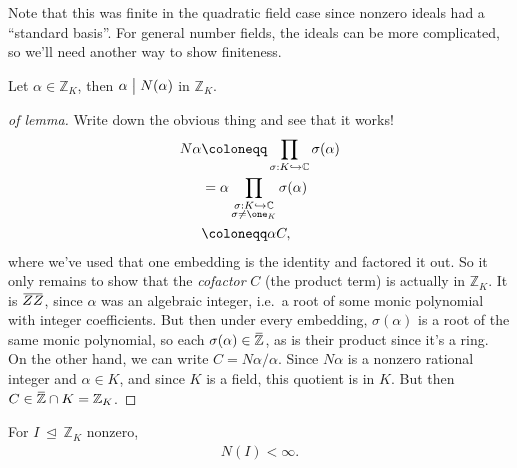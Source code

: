 \begin{remark}

Note that this was finite in the quadratic field case since nonzero
ideals had a ``standard basis''. For general number fields, the ideals
can be more complicated, so we'll need another way to show finiteness.

\end{remark}

\begin{lemma}

Let \(\alpha\in {\mathbb{Z}}_K\), then \(\alpha\bigm|N( \alpha)\) in
\({\mathbb{Z}}_K\).

\end{lemma}

\begin{proof}[of lemma]

Write down the obvious thing and see that it works!
\begin{align*}
N \alpha 
&\coloneqq\prod_{ \sigma: K \hookrightarrow{\mathbb{C}}} \sigma( \alpha) \\
&= \alpha \prod_{ \substack{ \sigma: K \hookrightarrow{\mathbb{C}}\\ \sigma\neq \one_K } } \sigma( \alpha) \\
&\coloneqq\alpha C 
,\end{align*}
where we've used that one embedding is the identity and factored it out.
So it only remains to show that the \emph{cofactor} \(C\) (the product
term) is actually in \({\mathbb{Z}}_K\). It is
\(\mkern 1.5mu\overline{\mkern-1.5muZZ\mkern-1.5mu}\mkern 1.5mu\), since
\(\alpha\) was an algebraic integer, i.e.~a root of some monic
polynomial with integer coefficients. But then under every embedding,
\(\sigma( \alpha)\) is a root of the same monic polynomial, so each
\(\sigma( \alpha) \in \mkern 1.5mu\overline{\mkern-1.5mu{\mathbb{Z}}\mkern-1.5mu}\mkern 1.5mu\),
as is their product since it's a ring. On the other hand, we can write
\(C = N \alpha/ \alpha\). Since \(N \alpha\) is a nonzero rational
integer and \(\alpha\in K\), and since \(K\) is a field, this quotient
is in \(K\). But then
\(C \in \mkern 1.5mu\overline{\mkern-1.5mu{\mathbb{Z}}\mkern-1.5mu}\mkern 1.5mu \cap K = {\mathbb{Z}}_K\).

\end{proof}

\begin{proposition}

For \(I{~\trianglelefteq~}{\mathbb{Z}}_K\) nonzero,
\begin{align*}
N(I) < \infty 
.\end{align*}

\end{proposition}

